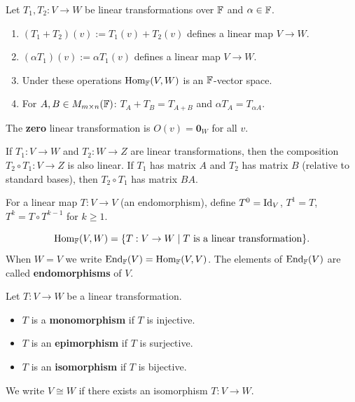 \begin{thmbox}
\label{thm:lt-algebra}
Let $T_1,T_2:V\to W$ be linear transformations over $\mathbb{F}$ and $\alpha\in\mathbb{F}$.
\begin{enumerate}[label=(\roman*)]
    \item $(T_1+T_2)(v) := T_1(v)+T_2(v)$ defines a linear map $V\to W$.
    \item $(\alpha T_1)(v) := \alpha T_1(v)$ defines a linear map $V\to W$.
    \item Under these operations $\operatorname{Hom}_{\mathbb{F}}(V,W)$ is an $\mathbb{F}$-vector space.
    \item For $A,B\in M_{m\times n}(\mathbb{F})$: $T_A+T_B=T_{A+B}$ and $\alpha T_A=T_{\alpha A}$.
\end{enumerate}
The \textbf{zero} linear transformation is $O(v)=\mathbf{0}_W$ for all $v$.
\end{thmbox}

\begin{propbox}
\label{prop:lt-composition}
If $T_1:V\to W$ and $T_2:W\to Z$ are linear transformations, then the
composition $T_2\circ T_1:V\to Z$ is also linear.  If $T_1$ has matrix $A$
and $T_2$ has matrix $B$ (relative to standard bases), then $T_2\circ T_1$
has matrix $BA$.
\end{propbox}

\begin{tipbox}
For a linear map $T:V\to V$ (an endomorphism), define $T^0=\mathrm{Id}_V$,
$T^1=T$, $T^k=T\circ T^{k-1}$ for $k\ge 1$.
\end{tipbox}

\begin{defbox}
\label{def:hom-end}
\[
    \operatorname{Hom}_{\mathbb{F}}(V,W) = \{T:V\to W \mid T \text{ is a linear transformation}\}.
\]
When $W=V$ we write $\operatorname{End}_{\mathbb{F}}(V)=\operatorname{Hom}_{\mathbb{F}}(V,V)$.  The elements of $\operatorname{End}_{\mathbb{F}}(V)$
are called \textbf{endomorphisms} of $V$.
\end{defbox}

\begin{defbox}
\label{def:morphism-types}
Let $T:V\to W$ be a linear transformation.
\begin{itemize}
    \item $T$ is a \textbf{monomorphism} if $T$ is injective.
    \item $T$ is an \textbf{epimorphism} if $T$ is surjective.
    \item $T$ is an \textbf{isomorphism} if $T$ is bijective.
\end{itemize}
We write $V\cong W$ if there exists an isomorphism $T:V\to W$.
\end{defbox}

